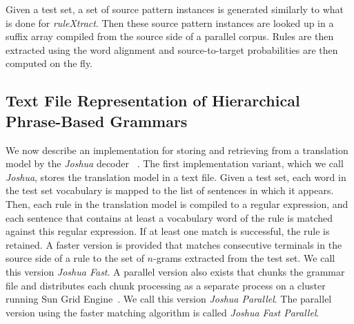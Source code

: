 Given a test set, a set of source pattern instances is generated similarly to
what is done for \emph{ruleXtract}. Then these source pattern instances are
looked up in a suffix array compiled from the source side of a parallel corpus.
Rules are then extracted using the word alignment and source-to-target
probabilities are then computed on the fly.

\subsection{Text File Representation of Hierarchical Phrase-Based Grammars}

We now describe an implementation for storing and retrieving from a translation
model by the \emph{Joshua}
decoder~ \citep{weese-ganitkevitch-callisonburch-post-lopez:2011:WMT}.
The first implementation variant, which we call \emph{Joshua}, stores the
translation model in a text file. Given a test set, each word in the test set
vocabulary is mapped to the list of sentences in which it appears. Then, each
rule in the translation model is compiled to a regular expression, and each
sentence that contains at least a vocabulary word of the rule is matched against
this regular expression. If at least one match is successful, the rule is
retained. A faster version is provided that matches consecutive terminals in the
source side of a rule to the set of $n$-grams extracted from the test set. We
call this version \emph{Joshua Fast}. A parallel version also exists that chunks
the grammar file and distributes each chunk processing as a separate process on
a cluster running Sun Grid Engine~\citep{gentzsch:2001:CCG}. We call this
version \emph{Joshua Parallel}. The parallel version using the faster matching
algorithm is called \emph{Joshua Fast Parallel}.

